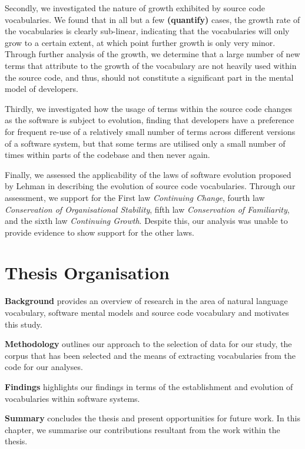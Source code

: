 Secondly, we investigated the nature of growth exhibited by source code vocabularies. We found that in all but a few \textbf{(quantify)} cases, the growth rate of the vocabularies is clearly sub-linear, indicating that the vocabularies will only grow to a certain extent, at which point further growth is only very minor. Through further analysis of the growth, we determine that a large number of new terms that attribute to the growth of the vocabulary are not heavily used within the source code, and thus, should not constitute a significant part in the mental model of developers.

Thirdly, we investigated how the usage of terms within the source code changes as the software is subject to evolution, finding that developers have a preference for frequent re-use of a relatively small number of terms across different versions of a software system, but that some terms are utilised only a small number of times within parts of the codebase and then never again.

Finally, we assessed the applicability of the laws of software evolution proposed by Lehman \cite{Lehman80a,Lehman97a} in describing the evolution of source code vocabularies. Through our assessment, we support for the First law \emph{Continuing Change}, fourth law \emph{Conservation of Organisational Stability}, fifth law \emph{Conservation of Familiarity}, and the sixth law \emph{Continuing Growth}. Despite this, our analysis was unable to provide evidence to show support for the other laws.


\section{Thesis Organisation} %
\label{sec:thesis_organisation}

\textbf{Background} provides an overview of research in the area of natural language vocabulary, software mental models and source code vocabulary and motivates this study.

\textbf{Methodology} outlines our approach to the selection of data for our study, the corpus that has been selected and the means of extracting vocabularies from the code for our analyses.

\textbf{Findings} highlights our findings in terms of the establishment and evolution of vocabularies within software systems.

\textbf{Summary} concludes the thesis and present opportunities for future work. In this chapter, we summarise our contributions resultant from the work within the thesis.

